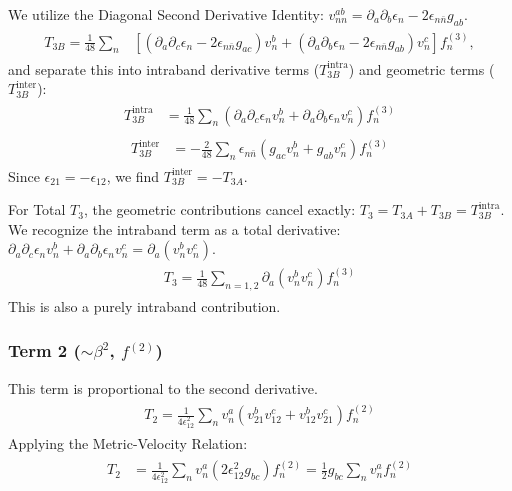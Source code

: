 \documentclass[twocolumn, prx, reprint, amsfonts, amsmath, amssymb, longbibliography, floatfix, aps]{revtex4-2}
\begin{document}
We utilize the Diagonal Second Derivative Identity: $v_{nn}^{ab} = \partial_a \partial_b \epsilon_n - 2 \epsilon_{n\bar{n}} g_{ab}$.
\begin{align}
\begin{aligned}
T_{3B} = \frac{1}{48} \sum_n & \left[ (\partial_a \partial_c \epsilon_n - 2 \epsilon_{n\bar{n}} g_{ac})v_n^b + (\partial_a \partial_b \epsilon_n - 2 \epsilon_{n\bar{n}} g_{ab})v_n^c \right] f_n^{(3)} ,
\end{aligned}
\end{align}
and separate this into intraband derivative terms ($T_{3B}^{\text{intra}}$) and geometric terms ($T_{3B}^{\text{inter}}$):
\begin{align}
\begin{aligned}
T_{3B}^{\text{intra}} &= \frac{1}{48} \sum_n (\partial_a \partial_c \epsilon_n v_n^b + \partial_a \partial_b \epsilon_n v_n^c) f_n^{(3)}
\end{aligned}
\end{align}
\begin{align}
\begin{aligned}
T_{3B}^{\text{inter}} &= -\frac{2}{48} \sum_n \epsilon_{n\bar{n}} (g_{ac}v_n^b + g_{ab}v_n^c) f_n^{(3)}
\end{aligned}
\end{align}
Since $\epsilon_{21} = -\epsilon_{12}$, we find $T_{3B}^{\text{inter}} = -T_{3A}$.

For Total $T_3$, the geometric contributions cancel exactly: $T_3 = T_{3A} + T_{3B} = T_{3B}^{\text{intra}}$. We recognize the intraband term as a total derivative: $\partial_a \partial_c \epsilon_n v_n^b + \partial_a \partial_b \epsilon_n v_n^c = \partial_a(v_n^b v_n^c)$.
\begin{align}
\begin{aligned}
T_3 = \frac{1}{48} \sum_{n=1,2} \partial_a(v_n^b v_n^c) f_n^{(3)}
\label{Term3-0}
\end{aligned}
\end{align}
This is also a purely intraband contribution.


\subsubsection*{Term 2 (\texorpdfstring{$\sim \beta^2$}{beta2}, \texorpdfstring{$f^{(2)}$}{f2})}
This term is proportional to the second derivative.
\begin{align}
\begin{aligned}
T_2 = \frac{1}{4\epsilon_{12}^2} \sum_n v_n^a (v_{21}^b v_{12}^c + v_{12}^b v_{21}^c) f_n^{(2)}
\end{aligned}
\end{align}
Applying the Metric-Velocity Relation:
\begin{align}
\begin{aligned}
T_2 &= \frac{1}{4\epsilon_{12}^2} \sum_n v_n^a (2\epsilon_{12}^2 g_{bc}) f_n^{(2)} = \frac{1}{2} g_{bc} \sum_n v_n^a f_n^{(2)}
\label{Term2-0}
\end{aligned}
\end{align}
\end{document}
